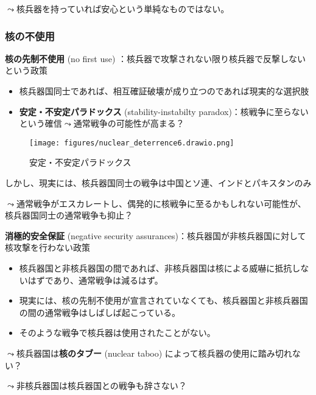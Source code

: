 \documentclass[
  xelatex,
  ja=standard]{bxjsarticle}
\providecommand{\tightlist}{%
  \setlength{\itemsep}{0pt}\setlength{\parskip}{0pt}}\usepackage{longtable,booktabs,array}
\begin{document}
\(\leadsto\)核兵器を持っていれば安心という単純なものではない。

\hypertarget{ux6838ux306eux4e0dux4f7fux7528}{%
\subsubsection{核の不使用}\label{ux6838ux306eux4e0dux4f7fux7528}}

\textbf{核の先制不使用} (no first use)
：核兵器で攻撃されない限り核兵器で反撃しないという政策

\begin{itemize}
\tightlist
\item
  核兵器国同士であれば、相互確証破壊が成り立つのであれば現実的な選択肢
\item
  \textbf{安定・不安定パラドックス} (stability-instabilty
  paradox)：核戦争に至らないという確信\(\leadsto\)通常戦争の可能性が高まる？\citep{jervis1979}
\end{itemize}

\begin{figure}[htpb]

{\centering \texttt{[image: figures/nuclear\_deterrence6.drawio.png]}

}

\caption{安定・不安定パラドックス}

\end{figure}

しかし、現実には、核兵器国同士の戦争は中国とソ連、インドとパキスタンのみ

\(\leadsto\)通常戦争がエスカレートし、偶発的に核戦争に至るかもしれない可能性が、核兵器国同士の通常戦争も抑止？

\textbf{消極的安全保証} (negative security
assurances)：核兵器国が非核兵器国に対して核攻撃を行わない政策

\begin{itemize}
\tightlist
\item
  核兵器国と非核兵器国の間であれば、非核兵器国は核による威嚇に抵抗しないはずであり、通常戦争は減るはず。
\item
  現実には、核の先制不使用が宣言されていなくても、核兵器国と非核兵器国の間の通常戦争はしばしば起こっている。
\item
  そのような戦争で核兵器は使用されたことがない。
\end{itemize}

\(\leadsto\)核兵器国は\textbf{核のタブー} (nuclear taboo)
によって核兵器の使用に踏み切れない？\citep{tannenwald2005}

\(\leadsto\)非核兵器国は核兵器国との戦争も辞さない？
\end{document}
